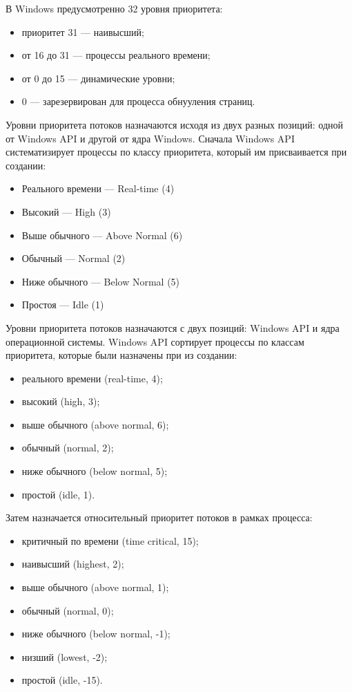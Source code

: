 В Windows предусмотренно 32 уровня приоритета:
\begin{itemize}
	\item приоритет 31 --- наивысший;

	\item от 16 до 31 --- процессы реального времени;

	\item от 0 до 15 --- динамические уровни;

	\item 0 --- зарезервирован для процесса обнууления страниц.

\end{itemize}

Уровни приоритета потоков назначаются исходя из двух разных позиций: одной от Windows API и другой от ядра Windows. Сначала Windows API систематизирует процессы по классу приоритета, который им присваивается при создании:
\begin{itemize}
	\item Реального времени — Real-time (4)
	\item Высокий — High (3)
	\item Выше обычного — Above Normal (6)
	\item Обычный — Normal (2)
	\item Ниже обычного — Below Normal (5)
	\item Простоя — Idle (1)
\end{itemize}

Уровни приоритета потоков назначаются с двух позиций: Windows API и ядра операционной системы. Windows API сортирует процессы по классам приоритета, которые были назначены при из создании:

\begin{itemize}
	\item реального времени (real-time, 4);
	\item высокий (high, 3);
	\item выше обычного (above normal, 6);
	\item обычный (normal, 2);
	\item ниже обычного (below normal, 5);
	\item простой (idle, 1).
\end{itemize}

Затем назначается относительный приоритет потоков в рамках процесса:

\begin{itemize}
	\item критичный по времени (time critical, 15);
	\item наивысший (highest, 2);
	\item выше обычного (above normal, 1);
	\item обычный (normal, 0);
	\item ниже обычного (below normal, -1);
	\item низший (lowest, -2);
	\item простой (idle, -15).
\end{itemize}

